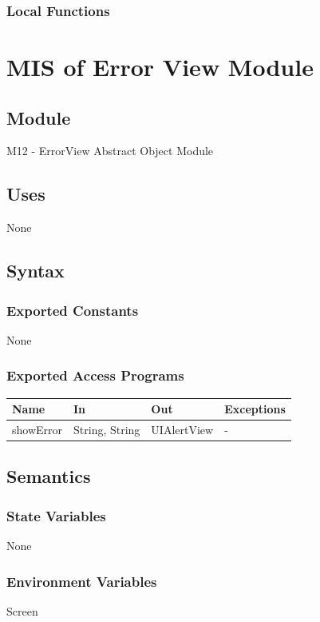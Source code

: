 \documentclass[12pt, titlepage]{article}
\begin{document}
\subsubsection{Local Functions}

\newpage
\section{MIS of Error View Module} \label{Module} 
\subsection{Module}
M12 - ErrorView
Abstract Object Module
\subsection{Uses}
None

\subsection{Syntax}
\subsubsection{Exported Constants}
None

\subsubsection{Exported Access Programs}
\begin{center}
\begin{tabular}{p{4cm} p{3cm} p{4cm} p{4cm}}
\hline
\textbf{Name} & \textbf{In} & \textbf{Out} & \textbf{Exceptions} \\
\hline
showError & String, String & UIAlertView & - \\
\hline
\end{tabular}
\end{center}

\subsection{Semantics}

\subsubsection{State Variables}
None

\subsubsection{Environment Variables}
Screen
\end{document}
